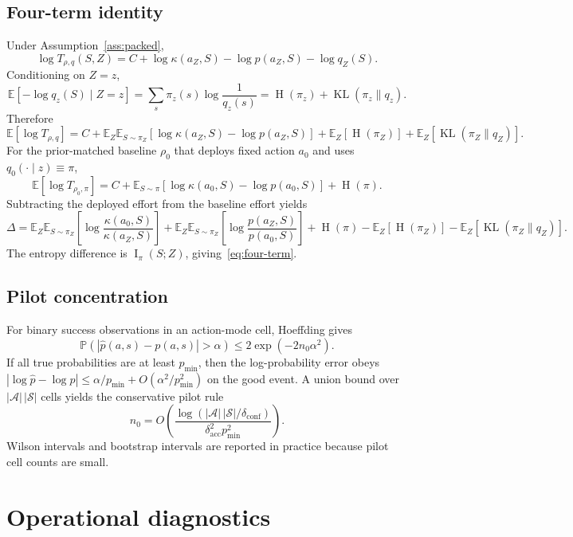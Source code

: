 \documentclass{article}
\DeclareMathOperator{\KL}{KL}
\DeclareMathOperator{\MI}{I}
\DeclareMathOperator{\Hent}{H}
\newcommand{\cA}{\mathcal{A}}
\newcommand{\cS}{\mathcal{S}}
\newcommand{\E}{\mathbb{E}}
\newcommand{\Prb}{\mathbb{P}}
\newcommand{\pmin}{p_{\min}}
\newcommand{\dconf}{\delta_{\mathrm{conf}}}
\newcommand{\dacc}{\delta_{\mathrm{acc}}}
\begin{document}
\subsection{Four-term identity}

Under Assumption~\ref{ass:packed},
\[
  \log T_{\rho,q}(S,Z)
  =
  C+\log\kappa(a_Z,S)-\log p(a_Z,S)-\log q_Z(S).
\]
Conditioning on $Z=z$,
\[
  \E[-\log q_z(S)\mid Z=z]
  =
  \sum_s \pi_z(s)\log\frac{1}{q_z(s)}
  =
  \Hent(\pi_z)+\KL(\pi_z\|q_z).
\]
Therefore
\[
  \E[\log T_{\rho,q}]
  =
  C+\E_Z\E_{S\sim\pi_Z}\!\left[\log\kappa(a_Z,S)-\log p(a_Z,S)\right]
  +\E_Z[\Hent(\pi_Z)]
  +\E_Z[\KL(\pi_Z\|q_Z)].
\]
For the prior-matched baseline $\rho_0$ that deploys fixed action $a_0$ and uses $q_0(\cdot\mid z)\equiv\pi$,
\[
  \E[\log T_{\rho_0,\pi}]
  =
  C+\E_{S\sim\pi}\!\left[\log\kappa(a_0,S)-\log p(a_0,S)\right]
  +\Hent(\pi).
\]
Subtracting the deployed effort from the baseline effort yields
\[
  \Delta
  =
  \E_Z\E_{S\sim\pi_Z}\!\left[\log\frac{\kappa(a_0,S)}{\kappa(a_Z,S)}\right]
  + \E_Z\E_{S\sim\pi_Z}\!\left[\log\frac{p(a_Z,S)}{p(a_0,S)}\right]
  + \Hent(\pi)-\E_Z[\Hent(\pi_Z)]
  - \E_Z[\KL(\pi_Z\|q_Z)] .
\]
The entropy difference is $\MI_\pi(S;Z)$, giving~\eqref{eq:four-term}.

\subsection{Pilot concentration}

For binary success observations in an action-mode cell, Hoeffding gives
\[
  \Prb(|\hat p(a,s)-p(a,s)|>\alpha)\le 2\exp(-2n_0\alpha^2).
\]
If all true probabilities are at least $\pmin$, then the log-probability error obeys
$|\log \hat p-\log p|\le \alpha/\pmin+O(\alpha^2/\pmin^2)$ on the good event.
A union bound over $|\cA|\,|\cS|$ cells yields the conservative pilot rule
\[
  n_0
  =
  O\!\left(
  \frac{\log(|\cA|\,|\cS|/\dconf)}{\dacc^2\pmin^2}
  \right).
\]
Wilson intervals and bootstrap intervals are reported in practice because pilot cell counts are small.

\section{Operational diagnostics}
\label{subsec:bridge}
\end{document}

